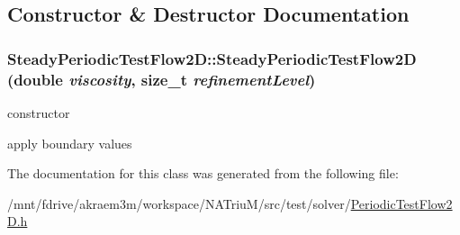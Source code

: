 \subsection{Constructor \& Destructor Documentation}
\hypertarget{classSteadyPeriodicTestFlow2D_ab5920c3efd71be68da68c87745f98c28}{
\subsubsection[{SteadyPeriodicTestFlow2D}]{\setlength{\rightskip}{0pt plus 5cm}SteadyPeriodicTestFlow2D::SteadyPeriodicTestFlow2D (double {\em viscosity}, \/  size\_\-t {\em refinementLevel})}}
\label{classSteadyPeriodicTestFlow2D_ab5920c3efd71be68da68c87745f98c28}


constructor 

apply boundary values 

The documentation for this class was generated from the following file:\begin{DoxyCompactItemize}
\item 
/mnt/fdrive/akraem3m/workspace/NATriuM/src/test/solver/\hyperlink{PeriodicTestFlow2D_8h}{PeriodicTestFlow2D.h}\end{DoxyCompactItemize}
